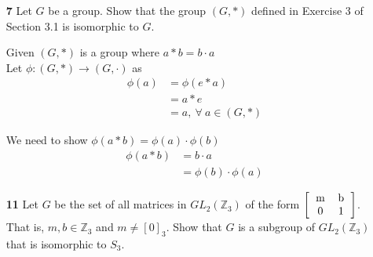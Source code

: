 \documentclass[paper=usletter, fontsize=12pt]{article}
\begin{document}
\begin{itemize}
\begin{itemize}
\begin{cproof}
            \end{cproof}

            \item[\textbf{7}] Let $G$ be a group. Show that the group $(G, *)$
            defined in Exercise 3 of Section 3.1 is isomorphic to $G$.
            \begin{cproof}

                Given $(G, *)$ is a group where $a*b=b\cdot a$\\
                Let $\phi: (G, *) \rightarrow (G, \cdot)$ as
                \begin{align*}
                    \phi(a) & = \phi(e * a)\\
                    & = a * e\\
                    & = a, \ \forall \ a \in (G, *)
                \end{align*}

                We need to show $\phi(a*b)=\phi(a)\cdot\phi(b)$
                \begin{align*}
                    \phi(a*b) & = b \cdot a\\
                    & = \phi(b)\cdot\phi(a)
                \end{align*}

            \end{cproof}

            \item[\textbf{11}] Let $G$ be the set of all matrices in
            $GL_2(\mathbb{Z}_3)$ of the form $\left[\begin{tabular}{cc}
                    m & b \\
                    0 & 1
                \end{tabular}\right]$. That is, $m, b \in \mathbb{Z}_3$ and
            $m\neq [0]_3$. Show that $G$ is a subgroup of
            $GL_2(\mathbb{Z}_3)$ that is isomorphic to $S_3$.
            \begin{cproof}


\end{cproof}
\end{itemize}
\end{itemize}
\end{document}
